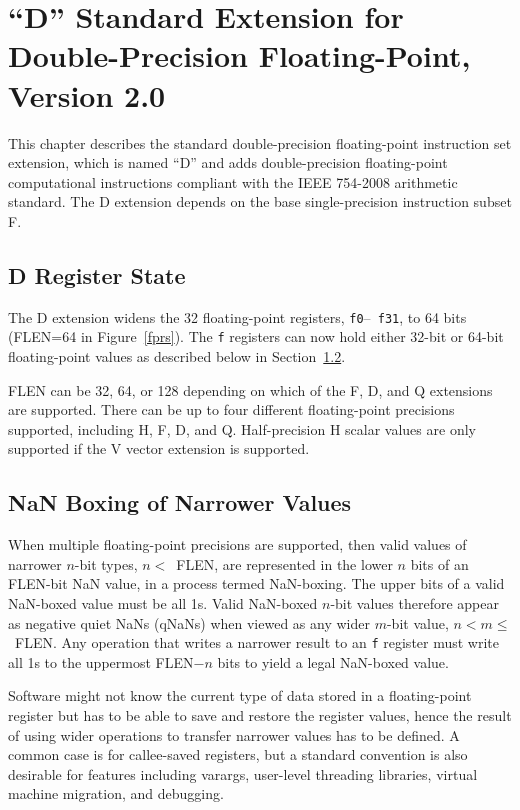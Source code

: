 \chapter{``D'' Standard Extension for Double-Precision Floating-Point,
Version 2.0}

This chapter describes the standard double-precision floating-point
instruction set extension, which is named ``D'' and adds
double-precision floating-point computational instructions compliant
with the IEEE 754-2008 arithmetic standard.  The D extension depends on
the base single-precision instruction subset F.

\section{D Register State}

The D extension widens the 32 floating-point registers, {\tt f0}--{\tt
  f31}, to 64 bits (FLEN=64 in Figure~\ref{fprs}).  The {\tt f}
registers can now hold either 32-bit or 64-bit floating-point values
as described below in Section~\ref{nanboxing}.

\begin{commentary}
FLEN can be 32, 64, or 128 depending on which of the F, D, and Q
extensions are supported.  There can be up to four different
floating-point precisions supported, including H, F, D, and Q.
Half-precision H scalar values are only supported if the V vector
extension is supported.
\end{commentary}

\section{NaN Boxing of Narrower Values}
\label{nanboxing}

When multiple floating-point precisions are supported, then valid
values of narrower $n$-bit types, \mbox{$n<$ FLEN}, are represented in
the lower $n$ bits of an FLEN-bit NaN value, in a process termed
NaN-boxing.  The upper bits of a valid NaN-boxed value must be all 1s.
Valid NaN-boxed $n$-bit values therefore appear as negative quiet NaNs
(qNaNs) when viewed as any wider $m$-bit value, \mbox{$n < m \leq$
  FLEN}.  Any operation that writes a narrower result to an {\tt f}
register must write all 1s to the uppermost FLEN$-n$ bits to yield a
legal NaN-boxed value.

\begin{samepage-commentary}
Software might not know the current type of data stored in a
floating-point register but has to be able to save and restore the
register values, hence the result of using wider operations to
transfer narrower values has to be defined.  A common case is for
callee-saved registers, but a standard convention is also desirable for
features including varargs, user-level threading libraries, virtual
machine migration, and debugging.
\end{samepage-commentary}

